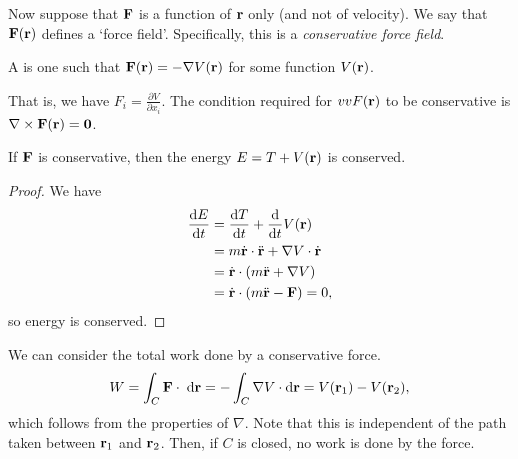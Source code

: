 \documentclass[a4paper]{scrartcl}
\begin{document}
Now suppose that $\mathbf{F}$ is a function of $\mathbf{r}$ only (and not of velocity). We say that $\mathbf{F}(\mathbf{r})$ defines a `force field'.
Specifically, this is a \emph{conservative force field}.

\begin{definition}
	A  is one such that $\mathbf{F}(\mathbf{r}) = - \nabla V(\mathbf{r})$ for some function $V(\mathbf{r})$.
\end{definition}

That is, we have $F_i = \frac{\partial V}{\partial x_i}$. The condition required for $vv{F}(\mathbf{r})$ to be conservative is $\nabla \times \mathbf{F}(\mathbf{r}) = \mathbf{0}$.

\begin{proposition}
	If $\mathbf{F}$ is conservative, then the energy $E = T + V(\mathbf{r})$ is conserved.
\end{proposition}
\begin{proof}
	We have
	\begin{align*}
		\frac{\mathrm{d} E}{\mathrm{d} t} &= \frac{\mathrm{d} T}{\mathrm{d} t} + \frac{\mathrm{d}}{\mathrm{d} t} V(\mathbf{r})\\
		&= m \dot{\mathbf{r}} \cdot \ddot{\mathbf{r}} + \nabla V \cdot \dot{\mathbf{r}}
 \\
&= \dot{\mathbf{r}} \cdot (m \ddot{\mathbf{r}} + \nabla V) \\
&= \dot{\mathbf{r}} \cdot (m \ddot{\mathbf{r}} - \mathbf{F}) = 0,
\end{align*}
so energy is conserved.
\end{proof}

We can consider the total work done by a conservative force.
$$
W = \int_C \mathbf{F} \cdot \; \mathrm{d} \mathbf{r} = - \int_C \nabla V \cdot \mathrm{d} \mathbf{r} = V(\mathbf{r}_1) - V(\mathbf{r}_2),
$$
which follows from the properties of $\nabla$. Note that this is independent of the path taken between $\mathbf{r}_1$ and $\mathbf{r}_2$.
Then, if $C$ is closed, no work is done by the force.
\end{document}
